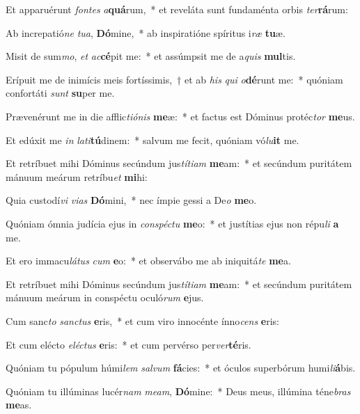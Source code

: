 \item Et apparuérunt \textit{fon}\textit{tes} \textit{a}\textbf{quá}rum,~* et reveláta sunt fundaménta orbis \textit{ter}\textbf{rá}rum:
\item Ab increpatió\textit{ne} \textit{tu}\textit{a}, \textbf{Dó}mine,~* ab inspiratióne spíritus i\textit{ræ} \textbf{tu}æ.
\item Misit de sum\textit{mo}, \textit{et} \textit{ac}\textbf{cé}pit me:~* et assúmpsit me de a\textit{quis} \textbf{mul}tis.
\item Erípuit me de inimícis meis fortíssimis,~† et ab \textit{his} \textit{qui} \textit{o}\textbf{dé}runt me:~* quóniam confortáti \textit{sunt} \textbf{su}per me.
\item Prævenérunt me in die afflic\textit{ti}\textit{ó}\textit{nis} \textbf{me}æ:~* et factus est Dóminus protéc\textit{tor} \textbf{me}us.
\item Et edúxit me \textit{in} \textit{la}\textit{ti}\textbf{tú}dinem:~* salvum me fecit, quóniam vó\textit{lu}\textbf{it} me.
\item Et retríbuet mihi Dóminus secúndum jus\textit{tí}\textit{ti}\textit{am} \textbf{me}am:~* et secúndum puritátem mánuum meárum retríbu\textit{et} \textbf{mi}hi:
\item Quia custodí\textit{vi} \textit{vi}\textit{as} \textbf{Dó}mini,~* nec ímpie gessi a De\textit{o} \textbf{me}o.
\item Quóniam ómnia judícia ejus in \textit{con}\textit{spéc}\textit{tu} \textbf{me}o:~* et justítias ejus non répu\textit{li} \textbf{a} me.
\item Et ero immacu\textit{lá}\textit{tus} \textit{cum} \textbf{e}o:~* et observábo me ab iniquitá\textit{te} \textbf{me}a.
\item Et retríbuet mihi Dóminus secúndum jus\textit{tí}\textit{ti}\textit{am} \textbf{me}am:~* et secúndum puritátem mánuum meárum in conspéctu oculó\textit{rum} \textbf{e}jus.
\item Cum sanc\textit{to} \textit{sanc}\textit{tus} \textbf{e}ris,~* et cum viro innocénte ínno\textit{cens} \textbf{e}ris:
\item Et cum elécto \textit{e}\textit{léc}\textit{tus} \textbf{e}ris:~* et cum pervérso per\textit{ver}\textbf{té}ris.
\item Quóniam tu pópulum húmi\textit{lem} \textit{sal}\textit{vum} \textbf{fá}cies:~* et óculos superbórum humi\textit{li}\textbf{á}bis.
\item Quóniam tu illúminas lucér\textit{nam} \textit{me}\textit{am}, \textbf{Dó}mine:~* Deus meus, illúmina téne\textit{bras} \textbf{me}as.
